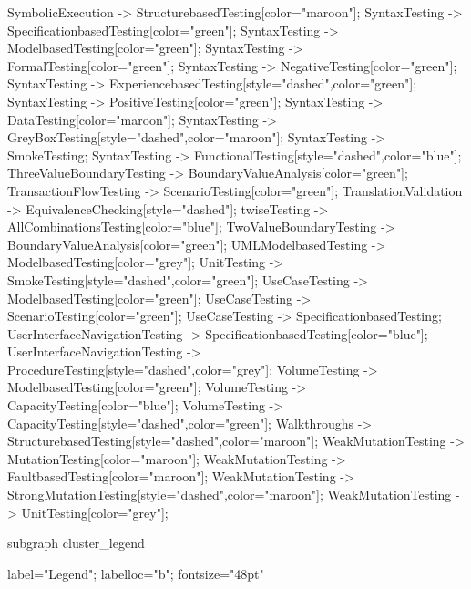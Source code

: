 \documentclass{article}
\begin{document}
{SymbolicExecution -> StructurebasedTesting[color="maroon"];
SyntaxTesting -> SpecificationbasedTesting[color="green"];
SyntaxTesting -> ModelbasedTesting[color="green"];
SyntaxTesting -> FormalTesting[color="green"];
SyntaxTesting -> NegativeTesting[color="green"];
SyntaxTesting -> ExperiencebasedTesting[style="dashed",color="green"];
SyntaxTesting -> PositiveTesting[color="green"];
SyntaxTesting -> DataTesting[color="maroon"];
SyntaxTesting -> GreyBoxTesting[style="dashed",color="maroon"];
SyntaxTesting -> SmokeTesting;
SyntaxTesting -> FunctionalTesting[style="dashed",color="blue"];
ThreeValueBoundaryTesting -> BoundaryValueAnalysis[color="green"];
TransactionFlowTesting -> ScenarioTesting[color="green"];
TranslationValidation -> EquivalenceChecking[style="dashed"];
twiseTesting -> AllCombinationsTesting[color="blue"];
TwoValueBoundaryTesting -> BoundaryValueAnalysis[color="green"];
UMLModelbasedTesting -> ModelbasedTesting[color="grey"];
UnitTesting -> SmokeTesting[style="dashed",color="green"];
UseCaseTesting -> ModelbasedTesting[color="green"];
UseCaseTesting -> ScenarioTesting[color="green"];
UseCaseTesting -> SpecificationbasedTesting;
UserInterfaceNavigationTesting -> SpecificationbasedTesting[color="blue"];
UserInterfaceNavigationTesting -> ProcedureTesting[style="dashed",color="grey"];
VolumeTesting -> ModelbasedTesting[color="green"];
VolumeTesting -> CapacityTesting[color="blue"];
VolumeTesting -> CapacityTesting[style="dashed",color="green"];
Walkthroughs -> StructurebasedTesting[style="dashed",color="maroon"];
WeakMutationTesting -> MutationTesting[color="maroon"];
WeakMutationTesting -> FaultbasedTesting[color="maroon"];
WeakMutationTesting -> StrongMutationTesting[style="dashed",color="maroon"];
WeakMutationTesting -> UnitTesting[color="grey"];

subgraph cluster_legend {

    label="Legend";
    labelloc="b";
    fontsize="48pt"

}}
\end{document}
